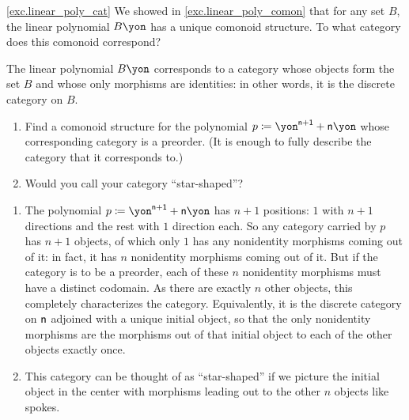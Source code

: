 \documentclass[Book-Poly]{subfiles}
\begin{document}
\begin{exercise} \cref{exc.linear_poly_cat}
We showed in \cref{exc.linear_poly_comon} that for any set $B$, the linear polynomial $B\yon$ has a unique comonoid structure.
To what category does this comonoid correspond?
\begin{solution}
The linear polynomial $B\yon$ corresponds to a category whose objects form the set $B$ and whose only morphisms are identities: in other words, it is the discrete category on $B$.
\end{solution}
\end{exercise}

\begin{exercise}\label{ex.star_shaped}
\begin{enumerate}
	\item Find a comonoid structure for the polynomial $p\coloneqq{\yon}^{\ord{n}+\1}+\ord{n}\yon$ whose corresponding category is a preorder.
	(It is enough to fully describe the category that it corresponds to.)
	\item Would you call your category ``star-shaped''?
\qedhere
\end{enumerate}
\begin{solution}
\begin{enumerate}
    \item The polynomial $p\coloneqq{\yon}^{\ord{n}+\1}+\ord{n}\yon$ has $n+1$ positions: $1$ with $n+1$ directions and the rest with $1$ direction each.
    So any category carried by $p$ has $n+1$ objects, of which only $1$ has any nonidentity morphisms coming out of it: in fact, it has $n$ nonidentity morphisms coming out of it.
    But if the category is to be a preorder, each of these $n$ nonidentity morphisms must have a distinct codomain.
    As there are exactly $n$ other objects, this completely characterizes the category.
    Equivalently, it is the discrete category on $\mathsf{n}$ adjoined with a unique initial object, so that the only nonidentity morphisms are the morphisms out of that initial object to each of the other objects exactly once.
    \item This category can be thought of as ``star-shaped'' if we picture the initial object in the center with morphisms leading out to the other $n$ objects like spokes.
\end{enumerate}
\end{solution}
\end{exercise}
\end{document}
